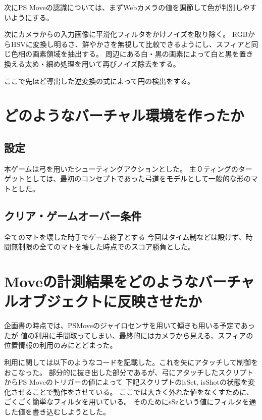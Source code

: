\documentclass[11pt,a4j]{jsarticle}
\begin{document}
次にPS Moveの認識については、まずWebカメラの値を調節して色が判別しやすいようにする。

次にカメラからの入力画像に平滑化フィルタをかけノイズを取り除く。
RGBからHSVに変換し明るさ、鮮やかさを無視して比較できるようにし、スフィアと同じ色相の画素領域を抽出する。
周辺にある白・黒の画素によって白と黒を置き換える太め・細め処理を用いて再びノイズ除去をする。

ここで先ほど導出した逆変換の式によって円の検出をする。


\section{どのようなバーチャル環境を作ったか}

\subsection{設定}
本ゲームは弓を用いたシューティングアクションとした。
主０ティングのターゲットとしては、最初のコンセプトであった弓道をモデルとして一般的な形のマトとした。

\subsection{クリア・ゲームオーバー条件}
全てのマトを壊した時手でゲーム終了とする
今回はタイム制などは設けず、時間無制限の全てのマトを壊した時点でのスコア勝負とした。

\section{Moveの計測結果をどのようなバーチャルオブジェクトに反映させたか}
企画書の時点では、PSMoveのジャイロセンサを用いて傾きも用いる予定であったが
値の利用に手間取ってしまい、最終的にはカメラから見える、スフィアの位置情報の利用のみにとどまった。

利用に関しては以下のようなコードを記載した。これを矢にアタッチして制御をおこなった。
部分的に抜き出した部分であるが、弓にアタッチしたスクリプトからPS Moveのトリガーの値によって
下記スクリプトのisSet, isShotの状態を変化させることで動作をさせている。
ここでは大きく外れた値をなくすために、ごくごく簡単なフィルタを用いている。
そのためにsSzという値にフィルタを通した値を書き込むしようとした。
\end{document}
